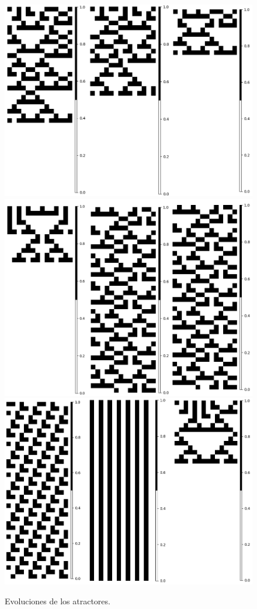 \documentclass[11pt]{article}
\begin{document}
			\begin{figure}[H]
			\centering
			\includegraphics[scale=0.3]{resources/Atractores22/atractor_22_size_14_res.png}
			\includegraphics[scale=0.3]{resources/Atractores22/atractor_22_size_14_res1.png}
			\includegraphics[scale=0.3]{resources/Atractores22/atractor_22_size_14_res2.png}
			\caption{Evoluciones de los atractores.}\label{fig:picture}
			\end{figure}
\end{document}
